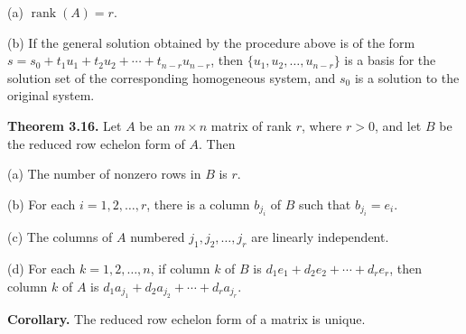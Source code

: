 \documentclass{article}
\newcommand{\0}{\mathit{0}}
\begin{document}
(a) $\operatorname{rank}(A) = r$.  

(b) If the general solution obtained by the procedure above is of the form  
$s = s_0 + t_1u_1 + t_2u_2 + \cdots + t_{n-r}u_{n-r}$,  
then $\{u_1, u_2, \ldots, u_{n-r}\}$ is a basis for the solution set of the  
corresponding homogeneous system, and $s_0$ is a solution to the original  
system.

\medskip

\textbf{Theorem 3.16.} Let $A$ be an $m \times n$ matrix of rank $r$, where $r > 0$,  
and let $B$ be the reduced row echelon form of $A$. Then  

(a) The number of nonzero rows in $B$ is $r$.  

(b) For each $i = 1, 2, \ldots, r$, there is a column $b_{j_i}$ of $B$ such that  
$b_{j_i} = e_i$.  

(c) The columns of $A$ numbered $j_1, j_2, \ldots, j_r$ are linearly independent.  

(d) For each $k = 1, 2, \ldots, n$, if column $k$ of $B$ is  
$d_1 e_1 + d_2 e_2 + \cdots + d_r e_r$, then column $k$ of $A$ is  
$d_1 a_{j_1} + d_2 a_{j_2} + \cdots + d_r a_{j_r}$.

\medskip

\textbf{Corollary.} The reduced row echelon form of a matrix is unique.
\end{document}
